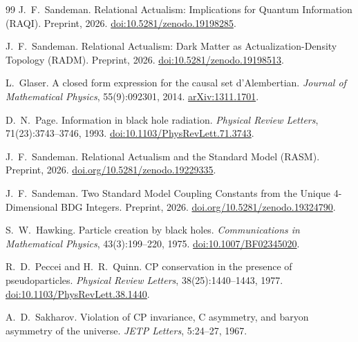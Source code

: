 \documentclass[11pt,a4paper]{article}
\begin{document}
\begin{thebibliography}{99}
J.~F.~Sandeman.
\newblock Relational Actualism: Implications for Quantum Information (RAQI).
\newblock Preprint, 2026.
\newblock \href{https://doi.org/10.5281/zenodo.19198285}%
  {doi:10.5281/zenodo.19198285}.

J.~F.~Sandeman.
\newblock Relational Actualism: Dark Matter as Actualization-Density
  Topology (RADM).
\newblock Preprint, 2026.
\newblock \href{https://doi.org/10.5281/zenodo.19198513}%
  {doi:10.5281/zenodo.19198513}.

L.~Glaser.
\newblock A closed form expression for the causal set d'Alembertian.
\newblock \emph{Journal of Mathematical Physics}, 55(9):092301, 2014.
\newblock \href{https://arxiv.org/abs/1311.1701}{arXiv:1311.1701}.

D.~N.~Page.
\newblock Information in black hole radiation.
\newblock \emph{Physical Review Letters}, 71(23):3743--3746, 1993.
\newblock \href{https://doi.org/10.1103/PhysRevLett.71.3743}{doi:10.1103/PhysRevLett.71.3743}.

J.~F.~Sandeman.
\newblock Relational Actualism and the Standard Model (RASM).
\newblock Preprint, 2026.
\newblock \href{https://doi.org/10.5281/zenodo.19229335}{doi.org/10.5281/zenodo.19229335}.

J.~F.~Sandeman.
\newblock Two Standard Model Coupling Constants from the Unique 4-Dimensional
  BDG Integers.
\newblock Preprint, 2026.
\newblock \href{https://doi.org/10.5281/zenodo.19324790}{doi.org/10.5281/zenodo.19324790}.

S.~W.~Hawking.
\newblock Particle creation by black holes.
\newblock \emph{Communications in Mathematical Physics}, 43(3):199--220, 1975.
\newblock \href{https://doi.org/10.1007/BF02345020}{doi:10.1007/BF02345020}.

R.~D.~Peccei and H.~R.~Quinn.
\newblock CP conservation in the presence of pseudoparticles.
\newblock \emph{Physical Review Letters}, 38(25):1440--1443, 1977.
\newblock \href{https://doi.org/10.1103/PhysRevLett.38.1440}{doi:10.1103/PhysRevLett.38.1440}.

A.~D.~Sakharov.
\newblock Violation of CP invariance, C asymmetry, and baryon asymmetry of the universe.
\newblock \emph{JETP Letters}, 5:24--27, 1967.


\end{thebibliography}
\end{document}
